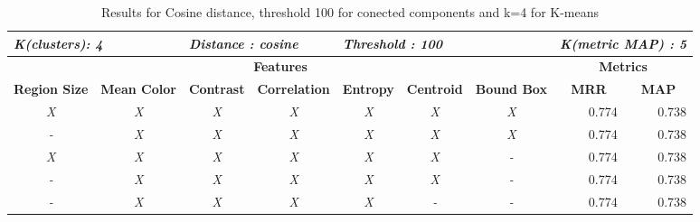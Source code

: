 \begin{table}[H]
\centering
\begin{tabular}{|c|c|c|c|c|c|c|r|r|}
\hline
\multicolumn{2}{|l|}{\textit{\textbf{K(clusters): 4}}} & \multicolumn{2}{l|}{\textit{\textbf{Distance : cosine}}} & \multicolumn{3}{l|}{\textit{\textbf{Threshold : 100}}} & \multicolumn{2}{l|}{\textit{\textbf{K(metric MAP) :  5}}} \\ \hline
\multicolumn{7}{|c|}{\textbf{Features}} & \multicolumn{2}{c|}{\textbf{Metrics}} \\ \hline
\textbf{Region Size} & \textbf{Mean Color} & \textbf{Contrast} & \textbf{Correlation} & \textbf{Entropy} & \textbf{Centroid} & \textbf{Bound Box} & \multicolumn{1}{c|}{\textbf{MRR}} & \multicolumn{1}{c|}{\textbf{MAP}} \\ \hline
\textit{X} & \textit{X} & \textit{X} & \textit{X} & \textit{X} & \textit{X} & \textit{X} & 0.774 & 0.738 \\ \hline
\textit{-} & \textit{X} & \textit{X} & \textit{X} & \textit{X} & \textit{X} & \textit{X} & 0.774 & 0.738 \\ \hline
\textit{X} & \textit{X} & \textit{X} & \textit{X} & \textit{X} & \textit{X} & \textit{-} & 0.774 & 0.738 \\ \hline
\textit{-} & \textit{X} & \textit{X} & \textit{X} & \textit{X} & \textit{X} & \textit{-} & 0.774 & 0.738 \\ \hline
\textit{-} & \textit{X} & \textit{X} & \textit{X} & \textit{X} & \textit{-} & \textit{-} & 0.774 & 0.738 \\ \hline
\end{tabular}
\caption{Results for Cosine distance, threshold 100 for conected components and k=4 for K-means}
\label{table:results02}
\end{table}


